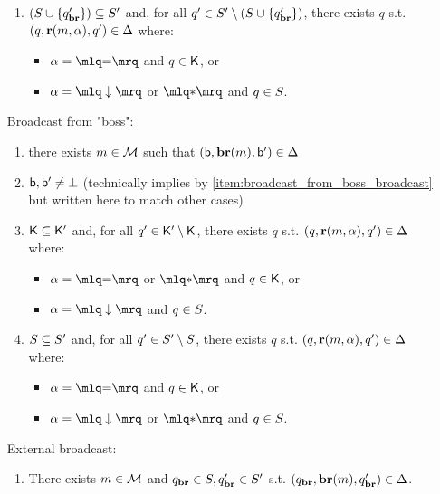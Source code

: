 \begin{definition}
\begin{enumerate}
\begin{enumerate}[label=(\roman*)]
		\item\label{item:broadcast_from_clique_covset}$(S \cup \{q_{\textbf{br}}'\}) \subseteq S'$ and, for all $q' \in S' \setminus (S \cup \{q_{\textbf{br}}'\})$, there exists $q$ s.t. $(q, \textbf{r}(m, \alpha), q') \in \Delta$ where:
		\begin{itemize}
			\item  $\anact = \quotemarks{\eqtestact}$ and $q \in \mathsf{K}$, or
			\item $\anact = \quotemarks{\enregact}$ or $\quotemarks{\dummyact}$ and $q \in S$.
		\end{itemize}
	\end{enumerate}
	\item[Broadcast from "boss":] 
	\begin{enumerate}[label=(\roman*)]
		\item \label{item:broadcast_from_boss_broadcast} there exists $m \in \mathcal{M}$ such that $(\mathsf{b}, \textbf{br}(m), \mathsf{b}') \in \Delta$
		
		\item\label{item:broadcast_from_boss_boss} $\mathsf{b}, \mathsf{b}' \ne \bot$ (technically implies by \ref{item:broadcast_from_boss_broadcast} but written here to match other cases)

		\item\label{item:broadcast_from_boss_clique} 	$\mathsf{K} \subseteq \mathsf{K}'$ and, for all $q' \in \mathsf{K}' \setminus \mathsf{K}$, there exists $q$ s.t. $(q, \textbf{r}(m, \alpha), q') \in \Delta$ where:
		\begin{itemize}
			\item $\anact = \quotemarks{\eqtestact}$ or $\quotemarks{\dummyact}$ and $q \in \mathsf{K}$, or
			\item $\anact= \quotemarks{\enregact}$ and $q \in S$.
		\end{itemize}
				
		\item\label{item:broadcast_from_boss_covset} $S \subseteq S'$ and, for all $q' \in S' \setminus S$, there exists $q$ s.t. $(q, \textbf{r}(m, \alpha), q') \in \Delta$ where:
		\begin{itemize}
			\item  $\anact = \quotemarks{\eqtestact}$ and $q \in \mathsf{K}$, or
			\item $\anact = \quotemarks{\enregact}$ or $\quotemarks{\dummyact}$ and $q \in S$.
		\end{itemize}
	\end{enumerate}
	\item[External broadcast:] 
	\begin{enumerate}[label=(\roman*)]
		\item\label{item:external_broadcast_broadcast} There exists $m \in \mathcal{M}$ and $q_{\textbf{br}} \in S, q_{\textbf{br}}' \in S'$ s.t. $(q_{\textbf{br}}, \textbf{br}(m), q_{\textbf{br}}') \in \Delta$. 
	

\end{enumerate}
\end{enumerate}
\end{definition}
